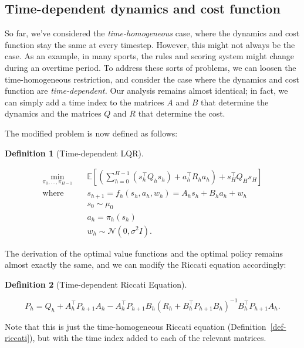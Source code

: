 \documentclass[
  letterpaper,
  DIV=11,
  numbers=noendperiod]{scrreprt}
\theoremstyle{plain}
\theoremstyle{plain}
\theoremstyle{definition}
\theoremstyle{definition}
\newtheorem{definition}{Definition}[chapter]
\theoremstyle{remark}
\begin{document}
\subsection{Time-dependent dynamics and cost
function}\label{sec-time_dep_lqr}

So far, we've considered the \emph{time-homogeneous} case, where the
dynamics and cost function stay the same at every timestep. However,
this might not always be the case. As an example, in many sports, the
rules and scoring system might change during an overtime period. To
address these sorts of problems, we can loosen the time-homogeneous
restriction, and consider the case where the dynamics and cost function
are \emph{time-dependent.} Our analysis remains almost identical; in
fact, we can simply add a time index to the matrices \(A\) and \(B\)
that determine the dynamics and the matrices \(Q\) and \(R\) that
determine the cost.

The modified problem is now defined as follows:

\begin{definition}[Time-dependent
LQR]\protect\hypertarget{def-time_dependent_lqr}{}\label{def-time_dependent_lqr}

\[
\begin{aligned}
        \min_{\pi_{0}, \dots, \pi_{H-1}} \quad & \mathbb{E}\left[ \left( \sum_{h=0}^{H-1} (s_h^\top Q_hs_h) + a_h^\top R_ha_h\right) + s_H^\top Q_Hs_H\right] \\
        \textrm{where} \quad                      & s_{h+1} = f_h(s_h, a_h, w_h) = A_hs_h+ B_ha_h+ w_h\\
                                                  & s_0 \sim \mu_0                                                                                                                                   \\
                                                  & a_h= \pi_h(s_h)                                                                                                                       \\
                                                  & w_h\sim \mathcal{N}(0, \sigma^2 I).
\end{aligned}
\]

\end{definition}

The derivation of the optimal value functions and the optimal policy
remains almost exactly the same, and we can modify the Riccati equation
accordingly:

\begin{definition}[Time-dependent Riccati
Equation]\protect\hypertarget{def-riccati_time_dependent}{}\label{def-riccati_time_dependent}

\[
P_h= Q_h+ A_h^\top P_{h+1} A_h- A_h^\top P_{h+1} B_h(R_h+ B_h^\top P_{h+1} B_h)^{-1} B_h^\top P_{h+1} A_h.
\]

Note that this is just the time-homogeneous Riccati equation
(Definition~\ref{def-riccati}), but with the time index added to each of
the relevant matrices.

\end{definition}
\end{document}
